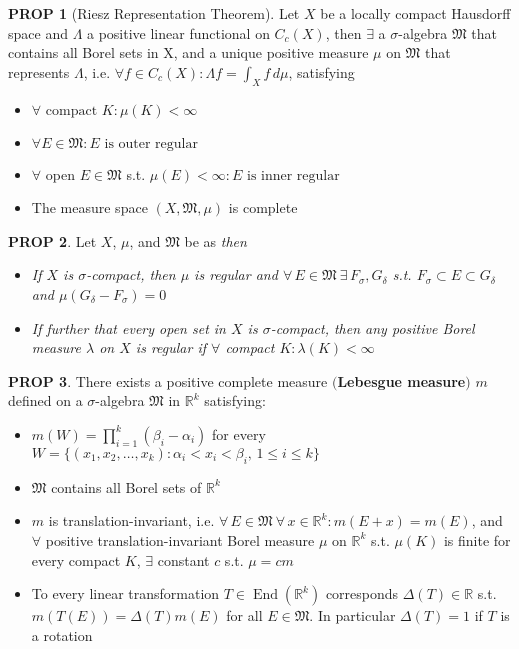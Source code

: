 \documentclass[hidelinks,10pt]{article}
\theoremstyle{definition}
\theoremstyle{dotles}
\theoremstyle{dotless}
\newtheorem{proposition}{PROP}[section]
\theoremstyle{remark}
\DeclareMathOperator{\End}{End}
\begin{document}
\begin{proposition}[Riesz Representation Theorem]\label{Prop 2.4}Let $X$ be a locally compact Hausdorff space and $\Lambda$ a positive linear functional on $C_c(X)$, then $\exists$ a $\sigma$-algebra $\mathfrak{M}$ that contains all Borel sets in X, and a unique positive measure $\mu$ on $\mathfrak{M}$ that represents $\Lambda$, i.e. $\forall f\in C_c(X):\Lambda  f=\int_Xf\,d\mu$, satisfying\begin{itemize}
    \item $\forall\textrm{ compact }K:\mu(K)<\infty$
    \item $\forall E\in\mathfrak{M}:E\textrm{ is outer regular}$
    \item $\forall$ open $E\in\mathfrak{M}$ s.t. $\mu(E)<\infty:E\textrm{ is inner regular}$
    \item The measure space $(X,\mathfrak{M},\mu)$ is complete
\end{itemize}
\end{proposition}

\begin{proposition}Let $X$, $\mu$, and $\mathfrak{M}$ be as \textit{ then}
\begin{itemize}
\item \textit{If $X$ is $\sigma$-compact, then $\mu$ is regular and $\forall\,E\in\mathfrak{M}\ \exists\,F_\sigma,G_\delta$ s.t. $F_\sigma\subset E\subset G_\delta$ and $\mu(G_\delta-F_\sigma)=0$}
\item \textit{If further that every open set in $X$ is $\sigma$-compact, then any positive Borel measure $\lambda$ on $X$ is regular if $\forall$ compact $K:\lambda(K)<\infty$}
\end{itemize}
\end{proposition}

\begin{proposition}There exists a positive complete measure $($\textbf{Lebesgue measure}$)$ $m$ defined on a $\sigma$-algebra $\mathfrak{M}$ in $\mathbb{R}^k$ satisfying:\begin{itemize}
    \item $m(W)=\prod_{i=1}^k(\beta_i-\alpha_i)$ for every $W=\{(x_1,x_2,\dots,x_k):\alpha_i<x_i<\beta_i,\,1\leq i\leq k\}$
    \item $\mathfrak{M}$ contains all Borel sets of $\mathbb{R}^k$
    \item $m$ is translation-invariant, i.e. $\forall\,E\in\mathfrak{M}\ \forall\, x\in\mathbb{R}^k:m(E+x)=m(E)$, and $\forall$ positive translation-invariant Borel measure $\mu$ on $\mathbb{R}^k$ s.t. $\mu(K)$ is finite for every compact $K$, $\exists$ constant $c$ s.t. $\mu=cm$
    \item To every linear transformation $T\in\End(\mathbb{R}^k)$ corresponds $\Delta(T)\in\mathbb{R}$ s.t. $m(T(E))=\Delta(T)m(E)$ for all $E\in\mathfrak{M}$. In particular $\Delta(T)=1$ if $T$ is a rotation
\end{itemize}
\end{proposition}
\end{document}
